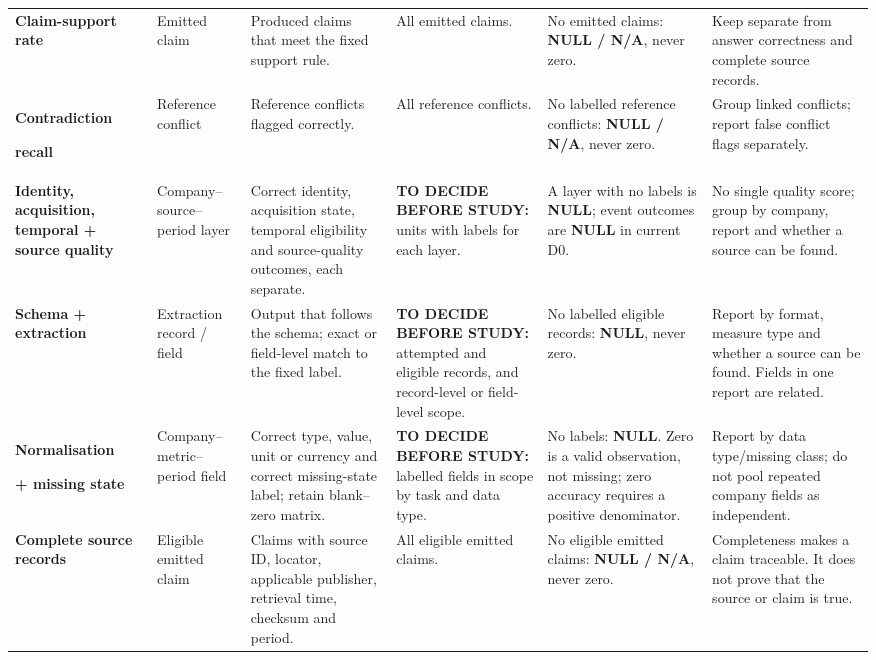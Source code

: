 \begin{longtable}{@{}P{0.14\textwidth}P{0.10\textwidth}P{0.19\textwidth}P{0.195\textwidth}P{0.15\textwidth}P{0.175\textwidth}@{}}
    \addlinespace[1.5pt]
    \textbf{Claim-support rate} &
    Emitted claim &
    Produced claims that meet the fixed support rule. &
    All emitted claims. &
    No emitted claims: \textbf{NULL / N/A}, never zero. &
    Keep separate from answer correctness and complete source records. \\

    \addlinespace[1.5pt]
    \textbf{Contradiction}\par\textbf{recall} &
    Reference conflict &
    Reference conflicts flagged correctly. &
    All reference conflicts. &
    No labelled reference conflicts: \textbf{NULL / N/A}, never zero. &
    Group linked conflicts; report false conflict flags separately. \\

    \addlinespace[1.5pt]
    \textbf{Identity, acquisition, temporal + source quality} &
    Company--source--period layer &
    Correct identity, acquisition state, temporal eligibility and source-quality outcomes, each separate. &
    \textbf{TO DECIDE BEFORE STUDY:} units with labels for each layer. &
    A layer with no labels is \textbf{NULL}; event outcomes are \textbf{NULL} in current D0. &
    No single quality score; group by company, report and whether a source can be found. \\

    \addlinespace[1.5pt]
    \textbf{Schema + extraction} &
    Extraction record / field &
    Output that follows the schema; exact or field-level match to the fixed label. &
    \textbf{TO DECIDE BEFORE STUDY:} attempted and eligible records, and record-level or field-level scope. &
    No labelled eligible records: \textbf{NULL}, never zero. &
    Report by format, measure type and whether a source can be found. Fields in one report are related. \\

    \addlinespace[1.5pt]
    \textbf{Normalisation}\par\textbf{+ missing state} &
    Company--metric--period field &
    Correct type, value, unit or currency and correct missing-state label; retain blank--zero matrix. &
    \textbf{TO DECIDE BEFORE STUDY:} labelled fields in scope by task and data type. &
    No labels: \textbf{NULL}. Zero is a valid observation, not missing; zero accuracy requires a positive denominator. &
    Report by data type/missing class; do not pool repeated company fields as independent. \\

    \addlinespace[1.5pt]
    \textbf{Complete source records} &
    Eligible emitted claim &
    Claims with source ID, locator, applicable publisher, retrieval time, checksum and period. &
    All eligible emitted claims. &
    No eligible emitted claims: \textbf{NULL / N/A}, never zero. &
    Completeness makes a claim traceable. It does not prove that the source or claim is true. \\


\end{longtable}
